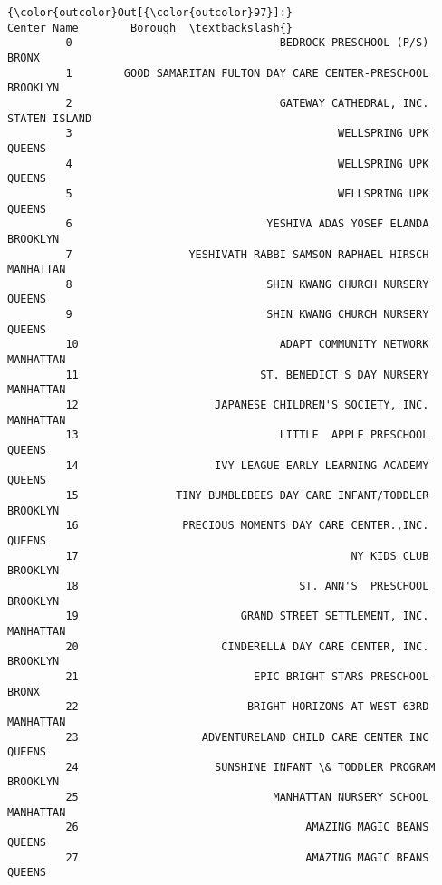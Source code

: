 \documentclass[11pt]{article}
\begin{document}
\begin{Verbatim}[commandchars=\\\{\}]
{\color{outcolor}Out[{\color{outcolor}97}]:}                                              Center Name        Borough  \textbackslash{}
         0                                BEDROCK PRESCHOOL (P/S)          BRONX   
         1        GOOD SAMARITAN FULTON DAY CARE CENTER-PRESCHOOL       BROOKLYN   
         2                                GATEWAY CATHEDRAL, INC.  STATEN ISLAND   
         3                                         WELLSPRING UPK         QUEENS   
         4                                         WELLSPRING UPK         QUEENS   
         5                                         WELLSPRING UPK         QUEENS   
         6                              YESHIVA ADAS YOSEF ELANDA       BROOKLYN   
         7                  YESHIVATH RABBI SAMSON RAPHAEL HIRSCH      MANHATTAN   
         8                              SHIN KWANG CHURCH NURSERY         QUEENS   
         9                              SHIN KWANG CHURCH NURSERY         QUEENS   
         10                               ADAPT COMMUNITY NETWORK      MANHATTAN   
         11                            ST. BENEDICT'S DAY NURSERY      MANHATTAN   
         12                     JAPANESE CHILDREN'S SOCIETY, INC.      MANHATTAN   
         13                               LITTLE  APPLE PRESCHOOL         QUEENS   
         14                     IVY LEAGUE EARLY LEARNING ACADEMY         QUEENS   
         15               TINY BUMBLEBEES DAY CARE INFANT/TODDLER       BROOKLYN   
         16                PRECIOUS MOMENTS DAY CARE CENTER.,INC.         QUEENS   
         17                                          NY KIDS CLUB       BROOKLYN   
         18                                  ST. ANN'S  PRESCHOOL       BROOKLYN   
         19                         GRAND STREET SETTLEMENT, INC.      MANHATTAN   
         20                      CINDERELLA DAY CARE CENTER, INC.       BROOKLYN   
         21                           EPIC BRIGHT STARS PRESCHOOL          BRONX   
         22                          BRIGHT HORIZONS AT WEST 63RD      MANHATTAN   
         23                   ADVENTURELAND CHILD CARE CENTER INC         QUEENS   
         24                     SUNSHINE INFANT \& TODDLER PROGRAM       BROOKLYN   
         25                              MANHATTAN NURSERY SCHOOL      MANHATTAN   
         26                                   AMAZING MAGIC BEANS         QUEENS   
         27                                   AMAZING MAGIC BEANS         QUEENS   

\end{Verbatim}
\end{document}
